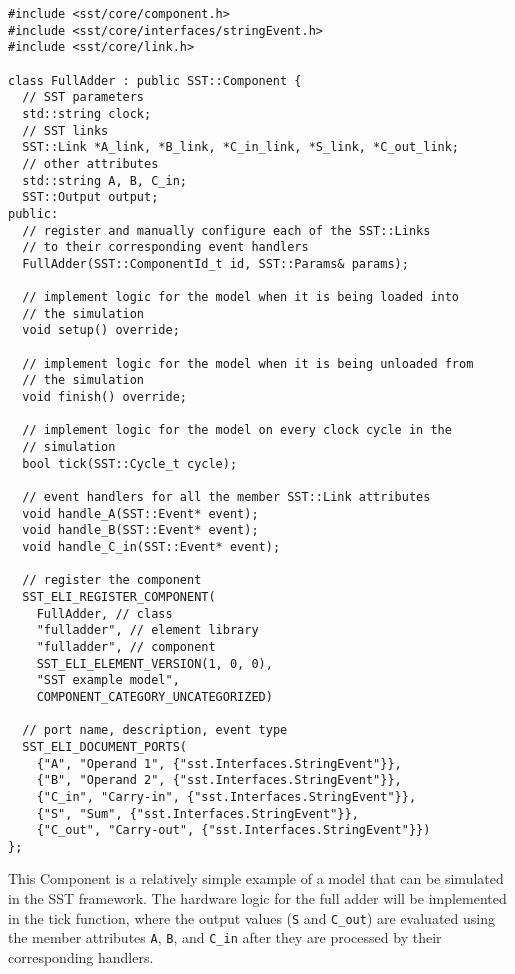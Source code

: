 \newpage
\begin{lstlisting}[style=customC++,label=currentModel,caption=Example Interface of an SST Component Model \\ File: FullAdder.hpp]
#include <sst/core/component.h>
#include <sst/core/interfaces/stringEvent.h>
#include <sst/core/link.h>

class FullAdder : public SST::Component {
  // SST parameters
  std::string clock;
  // SST links
  SST::Link *A_link, *B_link, *C_in_link, *S_link, *C_out_link;
  // other attributes
  std::string A, B, C_in;
  SST::Output output;
public:
  // register and manually configure each of the SST::Links
  // to their corresponding event handlers
  FullAdder(SST::ComponentId_t id, SST::Params& params);

  // implement logic for the model when it is being loaded into
  // the simulation
  void setup() override;

  // implement logic for the model when it is being unloaded from
  // the simulation
  void finish() override;

  // implement logic for the model on every clock cycle in the
  // simulation
  bool tick(SST::Cycle_t cycle);

  // event handlers for all the member SST::Link attributes
  void handle_A(SST::Event* event);
  void handle_B(SST::Event* event);
  void handle_C_in(SST::Event* event);

  // register the component
  SST_ELI_REGISTER_COMPONENT(
    FullAdder, // class
    "fulladder", // element library
    "fulladder", // component
    SST_ELI_ELEMENT_VERSION(1, 0, 0),
    "SST example model",
    COMPONENT_CATEGORY_UNCATEGORIZED)

  // port name, description, event type
  SST_ELI_DOCUMENT_PORTS(
    {"A", "Operand 1", {"sst.Interfaces.StringEvent"}},
    {"B", "Operand 2", {"sst.Interfaces.StringEvent"}},
    {"C_in", "Carry-in", {"sst.Interfaces.StringEvent"}},
    {"S", "Sum", {"sst.Interfaces.StringEvent"}},
    {"C_out", "Carry-out", {"sst.Interfaces.StringEvent"}})
};
\end{lstlisting}
\newpage

This Component is a relatively simple example of a model that can be simulated in the SST framework. The hardware logic for the full adder will be implemented in the tick function, where the output values (\texttt{S} and \texttt{C\_out}) are evaluated using the member attributes \texttt{A}, \texttt{B}, and \texttt{C\_in} after they are processed by their corresponding handlers.

